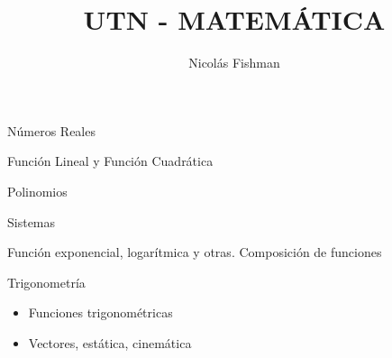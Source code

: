 \documentclass[12pt]{report}
\title{UTN - MATEMÁTICA}
\author{Nicolás Fishman}
\date{}
\begin{document}
\maketitle
\tableofcontents

\begin{itemize}
    {\item Números Reales}
     {\item Función Lineal y Función Cuadrática}
\end{itemize}





\begin{itemize}
    {\item Polinomios}
     {\item Sistemas}
\end{itemize}




\begin{itemize}
    {\item Función exponencial, logarítmica y otras. Composición de funciones}
     {\item Trigonometría}
\end{itemize}





\begin{itemize}
    \item Funciones trigonométricas
    \item Vectores, estática, cinemática
\end{itemize}


\end{document}
